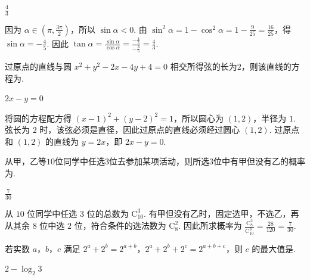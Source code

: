 \begin{answer}
    \(\frac{4}{3}\)
\end{answer}

\begin{solution}
因为 \(\alpha\in(\pi,\frac{3\pi}{2})\)，所以 \(\sin\alpha<0\). 由
\(\sin^{2}\alpha=1-\cos^{2}\alpha=1-\frac{9}{25}=\frac{16}{25}\)，得 \(\sin\alpha=-\frac45\). 因此
\(\tan\alpha=\frac{\sin\alpha}{\cos\alpha}=\frac{-\frac{4}{5}}{-\frac{3}{5}}=\frac43\).
\end{solution}

\begin{problem}
过原点的直线与圆 \(x^{2} + y^{2} - 2x - 4y + 4 = 0\) 相交所得弦的长为\(2\)，则该直线的方程为\fillinblank{}.
\end{problem}

\begin{answer}
    \(2x-y=0\)
\end{answer}

\begin{solution}
将圆的方程配方得
\((x-1)^{2}+(y-2)^{2}=1\)，所以圆心为 \((1,2)\)，半径为 \(1\). 弦长为 \(2\) 时，该弦必须是直径，因此过原点的直线必须经过圆心 \((1,2)\). 过原点和 \((1,2)\) 的直线为 \(y=2x\)，即
\(2x-y=0\).
\end{solution}

\begin{problem}
从甲，乙等\(10\)位同学中任选\(3\)位去参加某项活动，则所选\(3\)位中有甲但没有乙的概率为\fillinblank{}.
\end{problem}

\begin{answer}
    \(\frac{7}{30}\)
\end{answer}

\begin{solution}
从 \(10\) 位同学中任选 \(3\) 位的总数为 \(\mathrm C_{10}^{3}\). 有甲但没有乙时，固定选甲，不选乙，再从其余 \(8\) 位中选 \(2\) 位，符合条件的选法数为 \(\mathrm C_{8}^{2}\). 因此所求概率为
\(\frac{\mathrm C_{8}^{2}}{\mathrm C_{10}^{3}}=\frac{28}{120}=\frac{7}{30}\).
\end{solution}

\begin{problem}
若实数 \(a\)，\(b\)，\(c\) 满足 \(2^{a} + 2^{b} = 2^{a + b}\)，\(2^{a} + 2^{b} + 2^{c} = 2^{a + b + c}\)，则 \(c\) 的最大值是\fillinblank{}.
\end{problem}

\begin{answer}
    \(2-\log_{2}3\)
\end{answer}

